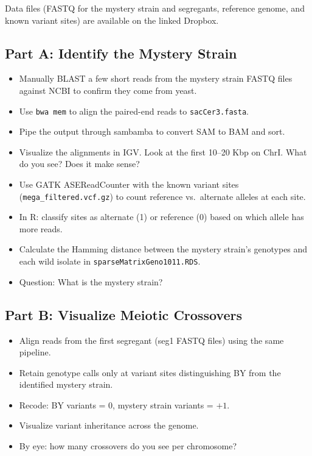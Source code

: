Data files (FASTQ for the mystery strain and segregants, reference genome, and known variant sites) are available on the linked Dropbox.

\subsection{Part A: Identify the Mystery Strain}

\begin{dobox}[Tasks]
\begin{itemize}[nosep]
  \item Manually BLAST a few short reads from the mystery strain FASTQ files against NCBI to confirm they come from yeast.
  \item Use \texttt{bwa mem} to align the paired-end reads to \texttt{sacCer3.fasta}.
  \item Pipe the output through sambamba to convert SAM to BAM and sort.
  \item Visualize the alignments in IGV. Look at the first 10--20 Kbp on ChrI. What do you see? Does it make sense?
  \item Use GATK ASEReadCounter with the known variant sites (\texttt{mega\_filtered.vcf.gz}) to count reference vs.\ alternate alleles at each site.
  \item In R: classify sites as alternate (1) or reference (0) based on which allele has more reads.
  \item Calculate the Hamming distance between the mystery strain's genotypes and each wild isolate in \texttt{sparseMatrixGeno1011.RDS}.
  \item Question: What is the mystery strain?
\end{itemize}
\end{dobox}

\subsection{Part B: Visualize Meiotic Crossovers}

\begin{dobox}[Tasks]
\begin{itemize}[nosep]
  \item Align reads from the first segregant (seg1 FASTQ files) using the same pipeline.
  \item Retain genotype calls only at variant sites distinguishing BY from the identified mystery strain.
  \item Recode: BY variants = 0, mystery strain variants = $+1$.
  \item Visualize variant inheritance across the genome.
  \item By eye: how many crossovers do you see per chromosome?
\end{itemize}
\end{dobox}

